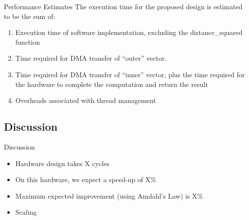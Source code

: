\begin{frame}[label=performance-estimates]{Performance Estimates}
    The execution time for the proposed design is estimated to be the sum of:
    \begin{enumerate}[<+->]
        \item Execution time of software implementation, excluding the
            distance\_squared function
        \item Time required for DMA transfer of ``outer'' vector.
        \item Time required for DMA transfer of ``inner'' vector, plus the time
            required for the hardware to complete the computation and return the
            result
        \item Overheads associated with thread management
    \end{enumerate}
\end{frame}

\subsection{Discussion}
\begin{frame}[label=discussion]{Discussion}
    \begin{itemize}
        \item Hardware design takes X cycles

        \item On this hardware, we expect a speed-up of X\%

        \item Maximum expected improvement (using Amdahl's Law) is X\%

        \item Scaling
    \end{itemize}
\end{frame}